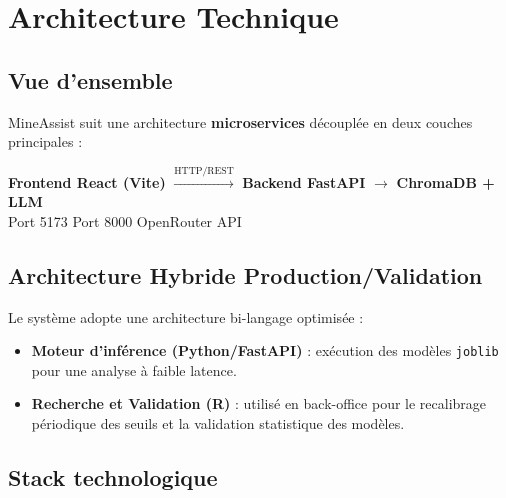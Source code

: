 \documentclass[12pt,a4paper]{report}
\begin{document}
\chapter{Architecture Technique}

\section{Vue d'ensemble}

MineAssist suit une architecture \textbf{microservices} découplée en deux couches principales :

\begin{center}
\begin{tcolorbox}[colback=ocpLight, colframe=ocpGreen, width=0.9\textwidth]
\centering
\textbf{Frontend React (Vite)} $\xrightarrow{\text{HTTP/REST}}$ \textbf{Backend FastAPI} $\xrightarrow{}$ \textbf{ChromaDB + LLM}\\[8pt]
\small{Port 5173 \hspace{4cm} Port 8000 \hspace{2cm} OpenRouter API}
\end{tcolorbox}
\end{center}

\section{Architecture Hybride Production/Validation}
Le système adopte une architecture bi-langage optimisée :
\begin{itemize}
  \item \textbf{Moteur d'inférence (Python/FastAPI)} : exécution des modèles \texttt{joblib} pour une analyse à faible latence.
  \item \textbf{Recherche et Validation (R)} : utilisé en back-office pour le recalibrage périodique des seuils et la validation statistique des modèles.
\end{itemize}
\section{Stack technologique}
\end{document}
